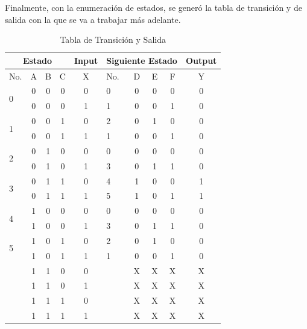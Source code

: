 \documentclass[11pt,letterpaper]{article}
\begin{document}
\newpage
Finalmente, con la enumeración de estados, se generó  la tabla de transición y de salida con la que se va a trabajar más adelante.
\begin{table}[h]
\centering
\caption{Tabla de Transición y Salida}
\vspace{0.2cm}
\label{tab_output}
\begin{tabular}{|l|c|c|c|c||l|c|c|c|c|}
\hline
\multicolumn{4}{|c|}{Estado}   & Input & \multicolumn{4}{l|}{Siguiente Estado} & Output \\ \hline
No.                & A & B & C & X      & No.       & D       & E      & F      &  Y      \\ \hline
\multirow{2}{*}{0} & 0 & 0 & 0 & 0     & 0         & 0       & 0      & 0      & 0      \\ \cline{2-10} 
                   & 0 & 0 & 0 & 1     & 1         & 0       & 0      & 1      & 0      \\ \hline
\multirow{2}{*}{1} & 0 & 0 & 1 & 0     & 2         & 0       & 1      & 0      & 0      \\ \cline{2-10} 
                   & 0 & 0 & 1 & 1     & 1         & 0       & 0      & 1      & 0      \\ \hline
\multirow{2}{*}{2} & 0 & 1 & 0 & 0     & 0         & 0       & 0      & 0      & 0      \\ \cline{2-10} 
                   & 0 & 1 & 0 & 1     & 3         & 0       & 1      & 1      & 0      \\ \hline
\multirow{2}{*}{3} & 0 & 1 & 1 & 0     & 4         & 1       & 0      & 0      & 1      \\ \cline{2-10} 
                   & 0 & 1 & 1 & 1     & 5         & 1       & 0      & 1      & 1      \\ \hline
\multirow{2}{*}{4} & 1 & 0 & 0 & 0     & 0         & 0       & 0      & 0      & 0      \\ \cline{2-10} 
                   & 1 & 0 & 0 & 1     & 3         & 0       & 1      & 1      & 0      \\ \hline
\multirow{2}{*}{5} & 1 & 0 & 1 & 0     & 2         & 0       & 1      & 0      & 0      \\ \cline{2-10} 
                   & 1 & 0 & 1 & 1     & 1         & 0       & 0      & 1      & 0      \\ \hline
\multirow{2}{*}{}  & 1 & 1 & 0 & 0     &           & X       & X      & X      & X      \\ \cline{2-10} 
                   & 1 & 1 & 0 & 1     &           & X       & X      & X      & X      \\ \hline
\multirow{2}{*}{}  & 1 & 1 & 1 & 0     &           & X       & X      & X      & X      \\ \cline{2-10} 
                   & 1 & 1 & 1 & 1     &           & X       & X      & X      & X      \\ \hline
\end{tabular}
\end{table}
\end{document}
